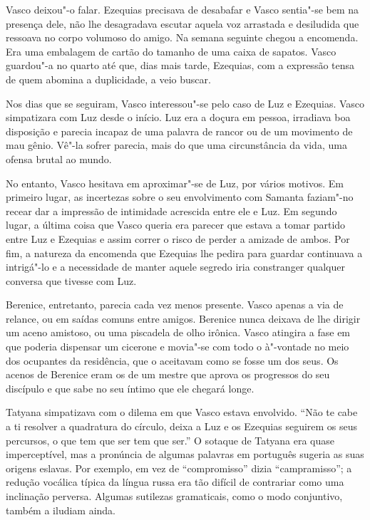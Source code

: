 Vasco
deixou"-o falar. Ezequias precisava de desabafar e Vasco sentia"-se bem na
presença dele, não lhe desagradava escutar aquela voz arrastada e
desiludida que ressoava no corpo volumoso do amigo. Na semana seguinte
chegou a encomenda. Era uma embalagem de cartão do tamanho de uma
caixa de sapatos. Vasco guardou"-a no quarto até que, dias mais tarde,
Ezequias, com a expressão tensa de quem abomina a duplicidade, a veio buscar.

Nos dias que se seguiram, Vasco interessou"-se pelo caso de Luz e
Ezequias. Vasco simpatizara com Luz desde o início. Luz era a doçura em
pessoa, irradiava boa disposição e parecia incapaz de uma palavra de
rancor ou de um movimento de mau gênio. Vê"-la sofrer parecia, mais do
que uma circunstância da vida, uma ofensa brutal ao mundo.

No entanto, Vasco hesitava em aproximar"-se de Luz, por vários motivos.
Em primeiro lugar, as incertezas sobre o seu envolvimento com Samanta
faziam"-no recear dar a impressão de intimidade acrescida entre ele e
Luz. Em segundo lugar, a última coisa que Vasco queria era parecer que
estava a tomar partido entre Luz e Ezequias e assim correr o risco de
perder a amizade de ambos. Por fim, a natureza da encomenda que Ezequias
lhe pedira para guardar continuava a intrigá"-lo e a
necessidade de manter aquele segredo iria constranger qualquer conversa
que tivesse com Luz.

Berenice, entretanto, parecia cada vez menos presente. Vasco apenas a
via de relance, ou em saídas comuns entre amigos. Berenice nunca deixava
de lhe dirigir um aceno amistoso, ou uma piscadela de olho irônica.
Vasco atingira a fase em que poderia dispensar um cicerone e movia"-se
com todo o à"-vontade no meio dos ocupantes da residência, que o aceitavam como se fosse um dos seus. Os acenos de Berenice eram os de um
mestre que aprova os progressos do seu discípulo e que sabe no seu
íntimo que ele chegará longe.

Tatyana simpatizava com o dilema em que Vasco estava envolvido. ``Não te
cabe a ti resolver a quadratura do círculo, deixa a Luz e os Ezequias
seguirem os seus percursos, o que tem que ser tem que ser.'' O sotaque de
Tatyana era quase imperceptível, mas a pronúncia de algumas palavras em
português sugeria as suas origens eslavas. Por exemplo, em vez de
``compromisso'' dizia ``campramisso''; a redução vocálica típica da
língua russa era tão difícil de contrariar como uma inclinação perversa.
Algumas sutilezas gramaticais, como o modo conjuntivo, também a iludiam
ainda.

